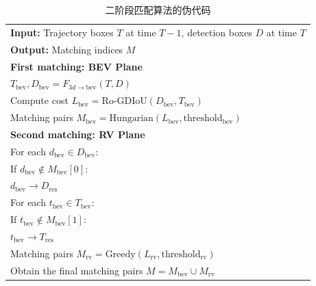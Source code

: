 \begin{table}[htbp]
	\centering
	\caption{二阶段匹配算法的伪代码}
	\begin{tabular}{p{}}
		\toprule
		\textbf{Input:} Trajectory boxes $T$ at time $T-1$, detection boxes $D$ at time $T$ \\

		\textbf{Output:} Matching indices $M$ \\
		\midrule
		\textbf{First matching: BEV Plane} \\
		\hspace{1em} $T_{\text{bev}}, D_{\text{bev}} = F_{3d \rightarrow \text{bev}}(T, D)$ \\
		\hspace{1em} Compute cost $L_{\text{bev}} = \text{Ro-GDIoU}(D_{\text{bev}}, T_{\text{bev}})$ \\
		\hspace{1em} Matching pairs $M_{\text{bev}} = \text{Hungarian}(L_{\text{bev}}, \text{threshold}_{\text{bev}})$ \\
		\midrule
		\textbf{Second matching: RV Plane} \\
		\hspace{1em} For each $d_{\text{bev}} \in D_{\text{bev}}$: \\
		\hspace{2em} If $d_{\text{bev}} \notin M_{\text{bev}}[0]$: \\
		\hspace{3em} $d_{\text{bev}} \rightarrow D_{\text{res}}$ \\
		\hspace{1em} For each $t_{\text{bev}} \in T_{\text{bev}}$: \\
		\hspace{2em} If $t_{\text{bev}} \notin M_{\text{bev}}[1]$: \\
		\hspace{3em} $t_{\text{bev}} \rightarrow T_{\text{res}}$ \\
		\hspace{1em} Matching pairs $M_{\text{rv}} = \text{Greedy}(L_{\text{rv}}, \text{threshold}_{\text{rv}})$ \\
		\midrule
		Obtain the final matching pairs $M = M_{\text{bev}} \cup M_{\text{rv}}$ \\
		\bottomrule
	\end{tabular}
\end{table}
